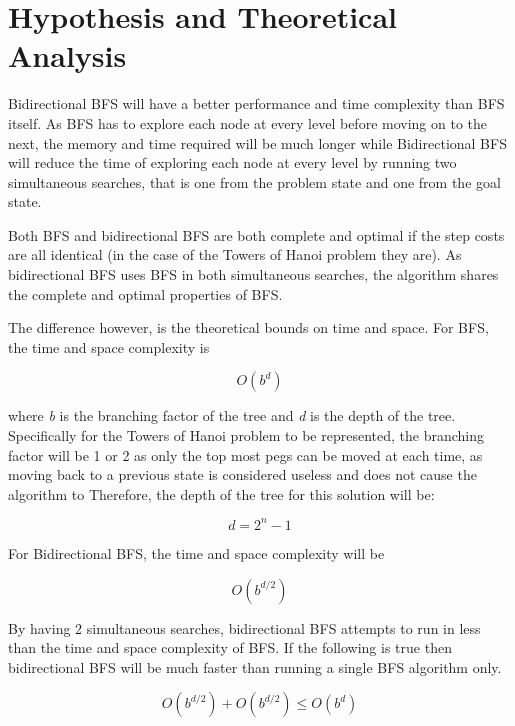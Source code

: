 \documentclass[conference]{IEEEtran}
\begin{document}
\section{Hypothesis and Theoretical Analysis}

Bidirectional BFS will have a better performance and time complexity than BFS itself. As BFS has to explore each node at every level before moving on to the next, the memory and time required will be much longer while Bidirectional BFS will reduce the time of exploring each node at every level by running two simultaneous searches, that is one from the problem state and one from the goal state. 

Both BFS and bidirectional BFS are both complete and optimal if the step costs are all identical (in the case of the Towers of Hanoi problem they are). As bidirectional BFS uses BFS in both simultaneous searches, the algorithm shares the complete and optimal properties of BFS.

The difference however, is the theoretical bounds on time and space. For BFS, the time and space complexity is 

\begin{equation}
 O(b^d)
\end{equation}

where \textit{b} is the branching factor of the tree and \textit{d} is the depth of the tree. Specifically for the Towers of Hanoi problem to be represented, the branching factor will be 1 or 2 as only the top most pegs can be moved at each time, as moving back to a previous state is considered useless and does not cause the algorithm to Therefore, the depth of the tree for this solution will be:

\begin{equation}
d = 2^n - 1
\end{equation}

For Bidirectional BFS, the time and space complexity will be 

\begin{equation}
 O(b^{d/2})
\end{equation}

By having 2 simultaneous searches, bidirectional BFS attempts to run in less than the time and space complexity of BFS. If 
the following is true then bidirectional BFS will be much faster than running a single BFS algorithm only. \cite{Textbook01}

\begin{equation}
O(b^{d/2}) + O(b^{d/2}) \leq O(b^d)
\end{equation}
\end{document}
